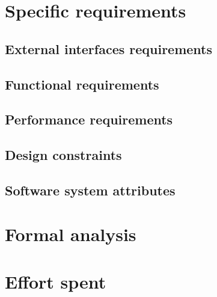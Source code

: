 \documentclass{article}
\begin{document}
\newpage

\section{Specific requirements}

\subsection{External interfaces requirements}
\subsection{Functional requirements}
\subsection{Performance requirements}
\subsection{Design constraints}
\subsection{Software system attributes}

\newpage

\section{Formal analysis}

\newpage

\section{Effort spent}
\end{document}
